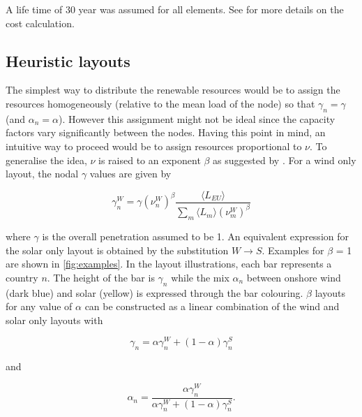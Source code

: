 \documentclass[a4paper, 5p, sort&compress]{elsarticle}%
\newcommand{\paren}[1]{\left(#1\right)}
\begin{document}
A life time of 30 year was assumed for all elements. See
\cite{Sensitivity} for more details on the cost calculation.

\subsection{Heuristic layouts}
\label{sec:heuristic-layouts}

The simplest way to distribute the renewable resources would be to
assign the resources homogeneously (relative to the mean load of the
node) so that $\gamma_{n} = \gamma$ (and $\alpha_{n} = \alpha$). However this assignment
might not be ideal since the capacity factors vary significantly
between the nodes. Having this point in mind, an intuitive way to
proceed would be to assign resources proportional to $\nu$. To
generalise the idea, $\nu$ is raised to an exponent $\beta$ as suggested by
\cite{Rolando}. For a wind only layout, the nodal $\gamma$ values are given by

\begin{equation}
  \label{eq:8}
  \gamma_{n}^{W} = \gamma \paren{\nu^{W}_{n}}^{\beta} \frac{\langle L_{EU}
    \rangle}{\sum_{m} \langle L_{m}
    \rangle \paren{\nu^{W}_{m}}^{\beta}}
\end{equation}

where $\gamma$ is the overall penetration assumed to be 1. An equivalent
expression for the solar only layout is obtained by the substitution
$W \to S$. Examples for $\beta$ = 1 are shown in \cref{fig:examples}. In
the layout illustrations, each bar represents a country $n$. The
height of the bar is $\gamma_{n}$ while the mix $\alpha_{n}$ between onshore
wind (dark blue) and solar (yellow) is expressed through the bar
colouring. $\beta$ layouts for any value of $\alpha$ can be constructed as a
linear combination of the wind and solar only layouts with


\begin{equation}
  \label{eq:9}
  \gamma_{n} = \alpha \gamma^{W}_{n} + (1-\alpha) \gamma^{S}_{n} 
\end{equation}

and

\begin{equation}
  \label{eq:9}
  \alpha_{n} = \frac{\alpha \gamma_{n}^{W}}{\alpha \gamma_{n}^{W} + (1-\alpha) \gamma_{n}^{S}} .
\end{equation}
\end{document}
